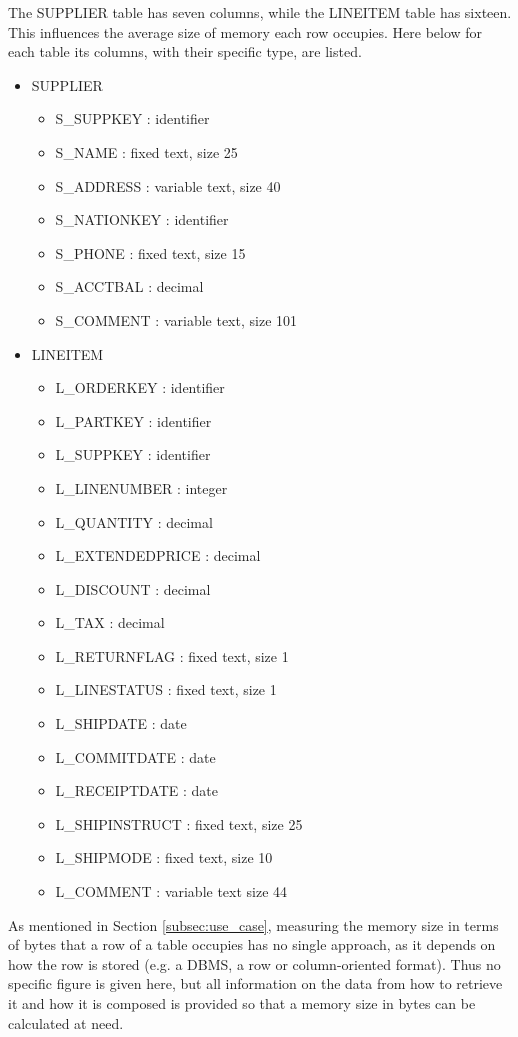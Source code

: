The SUPPLIER table has seven columns, while the LINEITEM table has sixteen. This influences the average size of memory each row occupies. Here below for each table its columns, with their specific type, are listed.
\begin{itemize}
  \item SUPPLIER
  \begin{itemize}
    \item S\_SUPPKEY : identifier
    \item S\_NAME : fixed text, size 25
    \item S\_ADDRESS : variable text, size 40
    \item S\_NATIONKEY : identifier
    \item S\_PHONE : fixed text, size 15
    \item S\_ACCTBAL : decimal
    \item S\_COMMENT : variable text, size 101
  \end{itemize}
  \item LINEITEM
  \begin{itemize}
    \item L\_ORDERKEY : identifier
    \item L\_PARTKEY : identifier
    \item L\_SUPPKEY : identifier
    \item L\_LINENUMBER : integer
    \item L\_QUANTITY : decimal
    \item L\_EXTENDEDPRICE : decimal
    \item L\_DISCOUNT : decimal
    \item L\_TAX : decimal
    \item L\_RETURNFLAG : fixed text, size 1
    \item L\_LINESTATUS : fixed text, size 1
    \item L\_SHIPDATE : date
    \item L\_COMMITDATE : date
    \item L\_RECEIPTDATE : date
    \item L\_SHIPINSTRUCT : fixed text, size 25
    \item L\_SHIPMODE : fixed text, size 10
    \item L\_COMMENT : variable text size 44
  \end{itemize} 
\end{itemize}
As mentioned in Section \ref{subsec:use_case}, measuring the memory size in terms of bytes that a row of a table occupies has no single approach, as it depends on how the row is stored (e.g. a \gls{DBMS}, a row or column-oriented format). Thus no specific figure is given here, but all information on the data from how to retrieve it and how it is composed is provided so that a memory size in bytes can be calculated at need.

